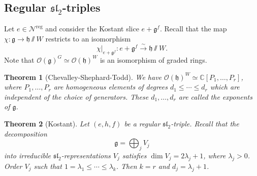 \documentclass{amsart}
\newtheorem{thm}{Theorem}[section]
\theoremstyle{definition}
\theoremstyle{remark}
\theoremstyle{plain}
\theoremstyle{definition}
\theoremstyle{remark}
\newcommand{\C}{\mathbb{C}}
\newcommand{\g}{\mathfrak{g}}
\newcommand{\h}{\mathfrak{h}}
\newcommand{\mc}[1]{\mathcal{#1}}
\newcommand{\mf}[1]{\mathfrak{#1}}
\newcommand{\on}[1]{\operatorname{#1}}
\newcommand{\1}{\mathbf{1}}
\newcommand{\2}{\mathbf{2}}
\newcommand{\3}{\mathbf{3}}
\renewcommand{\sl}{\mf{sl}}
\begin{document}
\subsection{Regular \(\sl_2\)-triples}%
\label{sub:Regular sl2-triples}

Let \(e \in \mc{N}^{\on{reg}}\) and consider the Kostant slice \(e + \g^f\). Recall that the map \(\chi \colon \g \to \h \sslash W\) restricts to an isomorphism
\[ \chi|_{e + \g^f} \colon e + \g^f \xrightarrow{\sim} \h \sslash W. \]
Note that \(\mc{O}(\g)^G \simeq \mc{O}(\h)^W\) is an isomorphism of graded rings.

\begin{thm}[Chevalley-Shephard-Todd]
    We have \(\mc{O}(\h)^W \simeq \C[P_1, \ldots, P_r]\), where \(P_1, \ldots, P_r\) are homogeneous elements of degrees \(d_1 \leq \cdots \leq d_r\) which are independent of the choice of generators. These \(d_1, \ldots, d_r\) are called the \textit{exponents} of \(\g\).
\end{thm}

\begin{thm}[Kostant]
    Let \((e,h,f)\) be a regular \(\sl_2\)-triple. Recall that the decomposition
    \[ \g = \bigoplus_j V_j \]
    into irreducible \(\sl_2\)-representations \(V_j\) satisfies \(\dim V_j = 2 \lambda_j + 1\), where \(\lambda_j > 0\). Order \(V_j\) such that \(1 = \lambda_1 \leq \cdots \leq \lambda_k\). Then \(k = r\) and \(d_j = \lambda_j + 1\).
\end{thm}
\end{document}
